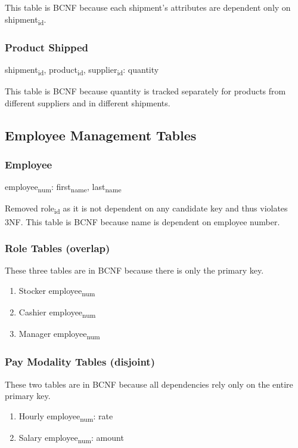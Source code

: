 \documentclass[11pt]{article}
\begin{document}
This table is BCNF because each shipment's attributes are dependent only on shipment\textsubscript{id}.
\subsubsection{Product Shipped}
\label{sec:org341226b}
shipment\textsubscript{id}, product\textsubscript{id}, supplier\textsubscript{id}: quantity

This table is BCNF because quantity is tracked separately for products from different suppliers and in different shipments.
\subsection{Employee Management Tables}
\label{sec:org84f16f6}
\subsubsection{Employee}
\label{sec:orgce595b7}
employee\textsubscript{num}: first\textsubscript{name}, last\textsubscript{name}

Removed role\textsubscript{id} as it is not dependent on any candidate key and thus violates 3NF.
This table is BCNF because name is dependent on employee number.
\subsubsection{Role Tables (overlap)}
\label{sec:org307e15e}
These three tables are in BCNF because there is only the primary key.
\begin{enumerate}
\item Stocker
\label{sec:orge5eb56d}
employee\textsubscript{num}
\item Cashier
\label{sec:org36e0299}
employee\textsubscript{num}
\item Manager
\label{sec:org13e0f02}
employee\textsubscript{num}
\end{enumerate}
\subsubsection{Pay Modality Tables (disjoint)}
\label{sec:orge2d6fd8}
These two tables are in BCNF because all dependencies rely only on the entire primary key.
\begin{enumerate}
\item Hourly
\label{sec:org1bd20f4}
employee\textsubscript{num}: rate
\item Salary
\label{sec:org8a748c8}
employee\textsubscript{num}: amount
\end{enumerate}
\end{document}
